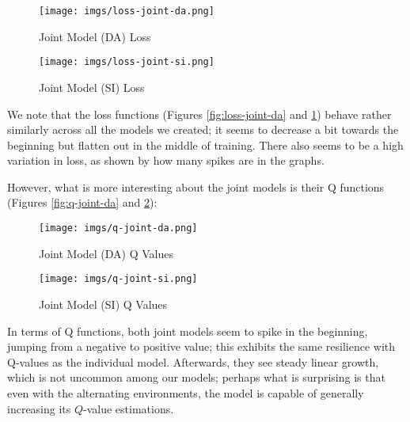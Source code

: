 \documentclass{article} %
\begin{document}
\begin{figure}
    \centering
    \begin{minipage}{0.45\textwidth}
        \centering
        \texttt{[image: imgs/loss-joint-da.png]} %
        \caption{Joint Model (DA) Loss}
        \label{fig:loss-joint-da}
    \end{minipage}\hfill
    \begin{minipage}{0.45\textwidth}
        \centering
        \texttt{[image: imgs/loss-joint-si.png]} %
        \caption{Joint Model (SI) Loss}
        \label{fig:loss-joint-si}
    \end{minipage}
\end{figure}

We note that the loss functions (Figures \ref{fig:loss-joint-da} and \ref{fig:loss-joint-si}) behave
rather similarly across all the models we created; it seems to decrease a bit towards the beginning
but flatten out in the middle of training. There also seems to be a high variation in loss, as shown
by how many spikes are in the graphs.

However, what is more interesting about the joint models is their Q functions (Figures
\ref{fig:q-joint-da} and \ref{fig:q-joint-si}):

\begin{figure}
    \centering
    \begin{minipage}{0.45\textwidth}
        \centering
        \texttt{[image: imgs/q-joint-da.png]} %
        \caption{Joint Model (DA) Q Values}
        \label{fig:q-joint-da}
    \end{minipage}\hfill
    \begin{minipage}{0.45\textwidth}
        \centering
        \texttt{[image: imgs/q-joint-si.png]} %
        \caption{Joint Model (SI) Q Values}
        \label{fig:q-joint-si}
    \end{minipage}
\end{figure}


In terms of Q functions, both joint models seem to spike in the beginning, jumping from a negative
to positive value; this exhibits the same resilience with Q-values as the individual model.
Afterwards, they see steady linear growth, which is not uncommon among our models; perhaps what is
surprising is that even with the alternating environments, the model is capable of generally
increasing its $Q$-value estimations.
\end{document}
